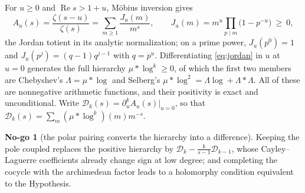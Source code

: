 \documentclass[11pt]{amsart}
\theoremstyle{definition}
\theoremstyle{remark}
\theoremstyle{definition}
\newtheorem{nogo}{No-go}[section]
\renewcommand{\Re}{\operatorname{Re}}
\begin{document}
For $u\ge0$ and $\Re s>1+u$, M\"obius inversion gives
\begin{equation}\label{eq:jordan}
   A_u(s)=\frac{\zeta(s-u)}{\zeta(s)}=\sum_{m\ge1}\frac{J_u(m)}{m^s},
   \qquad
   J_u(m)=m^u\prod_{p\mid m}\bigl(1-p^{-u}\bigr)\ \ge\ 0 ,
\end{equation}
the Jordan totient in its analytic normalization; on a prime power, $J_u(p^0)=1$ and
$J_u(p^j)=(q-1)q^{j-1}$ with $q=p^u$. Differentiating \eqref{eq:jordan} in $u$ at $u=0$
generates the full hierarchy $\mu*\log^k\ge0$, of which the first two members are Chebyshev's
$\Lambda=\mu*\log$ and Selberg's $\mu*\log^2=\Lambda\log+\Lambda*\Lambda$. All of these are
nonnegative arithmetic functions, and their positivity is exact and unconditional. Write
$\mathcal D_k(s)=\partial_u^kA_u(s)|_{u=0}$, so that $\mathcal D_k(s)=\sum_m(\mu*\log^k)(m)m^{-s}$.

\begin{nogo}[the polar pairing converts the hierarchy into a difference]\label{ng:jordan}
Keeping the pole coupled replaces the positive hierarchy by
$\mathcal D_k-\tfrac{k}{s-1}\mathcal D_{k-1}$, whose Cayley--Laguerre coefficients already change sign at low
degree; and completing the cocycle with the archimedean factor leads to a holomorphy condition
equivalent to the Hypothesis.
\end{nogo}
\end{document}
